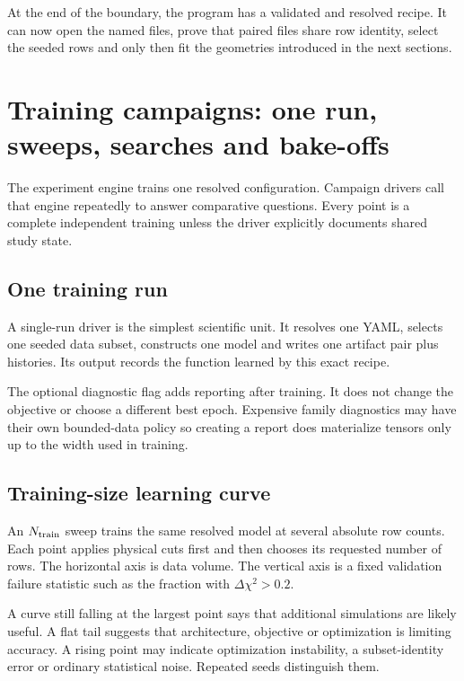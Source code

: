 \documentclass[10pt,aps,prd,twocolumn,nofootinbib]{revtex4-2}
\begin{document}
At the end of the boundary, the program has a validated and resolved recipe.
It can now open the named files, prove that paired files share row identity,
select the seeded rows and only then fit the geometries introduced in the
next sections.

\section{Training campaigns: one run, sweeps, searches and bake-offs}
\label{sec:campaigns}

The experiment engine trains one resolved configuration.  Campaign drivers
call that engine repeatedly to answer comparative questions.  Every point is a
complete independent training unless the driver explicitly documents shared
study state.

\subsection{One training run}

A single-run driver is the simplest scientific unit.  It resolves one YAML,
selects one seeded data subset, constructs one model and writes one artifact
pair plus histories.  Its output records the function learned by this exact
recipe.

The optional diagnostic flag adds reporting after training.  It does not
change the objective or choose a different best epoch.  Expensive family
diagnostics may have their own bounded-data policy so creating a report does
materialize tensors only up to the width used in training.

\subsection{Training-size learning curve}

An \(N_{\rm train}\) sweep trains the same resolved model at several absolute
row counts.  Each point applies physical cuts first and then chooses its
requested number of rows.  The horizontal axis is data volume.  The vertical
axis is a fixed validation failure statistic such as the fraction with
\(\Delta\chi^2>0.2\).

A curve still falling at the largest point says that additional simulations
are likely useful.  A flat tail suggests that architecture, objective or
optimization is limiting accuracy.  A rising point may indicate optimization
instability, a subset-identity error or ordinary statistical noise.  Repeated
seeds distinguish them.
\end{document}
